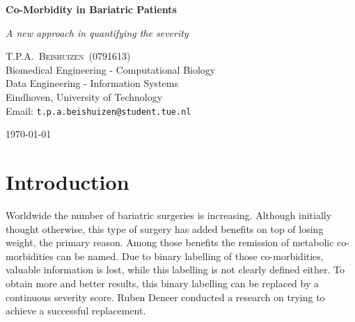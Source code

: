 \documentclass[10pt,a4paper]{article}
\newcommand{\documenttitle}{Co-Morbidity in Bariatric Patients}
\newcommand{\documentsubtitle}{A new approach in quantifying the severity}
\begin{document}
	
	\begin{titlepage}
		
		\center
		
		\vspace*{3cm}
		
		\textbf{\huge \documenttitle}
		
		\textit{\LARGE \documentsubtitle}
		
		\vspace*{2cm}
		
		\large
		\centering
		T.P.A.~\textsc{Beishuizen}~(0791613)\\
		Biomedical Engineering - Computational Biology\\
		Data Engineering - Information Systems\\
		Eindhoven, University of Technology\\
		Email: \texttt{t.p.a.beishuizen@student.tue.nl}
		
		\vfill
		
		\vspace*{1cm}
		
		\today
		
	\end{titlepage}
	
	\tableofcontents
	
	
	\pagestyle{fancy}
	\fancyhead{} %
	\fancyfoot{} %
	\renewcommand{\headrulewidth}{0.4pt}
	\renewcommand{\footrulewidth}{0.4pt}
	
	\fancyhead[L]{\rightmark}
	\fancyfoot[C]{\thepage}
		
	\clearpage
	
	\section{Introduction}
	\label{sec:Intro}
	
	Worldwide the number of bariatric surgeries is increasing. Although initially thought otherwise, this type of surgery has added benefits on top of losing weight, the primary reason. Among those benefits the remission of metabolic co-morbidities can be named. Due to binary labelling of those co-morbidities, valuable information is lost, while this labelling is not clearly defined either. To obtain more and better results, this binary labelling can be replaced by a continuous severity score. Ruben Deneer conducted a research on trying to achieve a successful replacement.\cite{Deneer2017Thesis}
	
\end{document}
